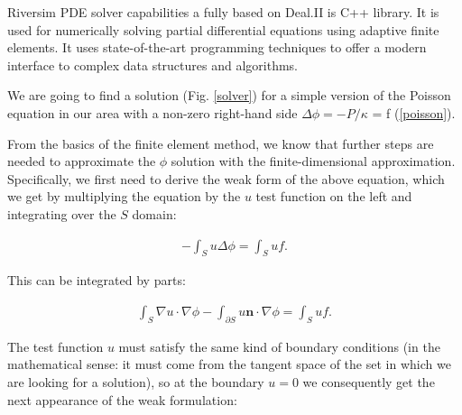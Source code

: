 \documentclass[]{pracamgr}
\begin{document}
      Riversim PDE solver capabilities a fully based on Deal.II\cite{dealII94} is C++ library. It is used for numerically solving partial differential equations using adaptive finite elements. It uses state-of-the-art programming techniques to offer a modern interface to complex data structures and algorithms.

      We are going to find a solution (Fig. \ref{solver}) for a simple version of the Poisson equation in our area with a non-zero right-hand side $\Delta \phi = -P/\kappa$ = f (\ref{poisson}).

      From the basics of the finite element method, we know that further steps are needed to approximate the $\phi$ solution with the finite-dimensional approximation. Specifically, we first need to derive the weak form of the above equation, which we get by multiplying the equation by the $u$ test function on the left and integrating over the $S$ domain:
      
      \begin{align*}
        -\int_S u \Delta \phi = \int_S u f.
      \end{align*}
      
      This can be integrated by parts:
      
      \begin{align*}
        \int_S \nabla u \cdot \nabla \phi
        -
        \int_{\partial S} u \mathbf{n}\cdot \nabla \phi
         = \int_S u f.
      \end{align*}
      
      The test function $u$ must satisfy the same kind of boundary conditions (in the mathematical sense: it must come from the tangent space of the set in which we are looking for a solution), so at the boundary $u=0$ we consequently get the next appearance of the weak formulation:
      
\end{document}
